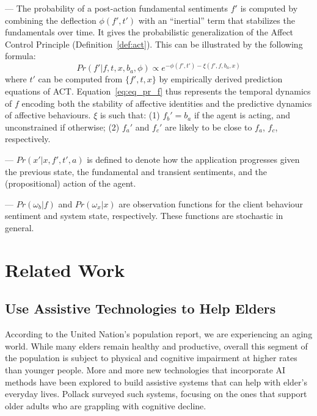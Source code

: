 --- The probability of a post-action fundamental sentiments $f'$ is computed by combining the deflection $\phi(f',t')$ with an ``inertial'' term that stabilizes the fundamentals over time. It gives the probabilistic generalization of the Affect Control Principle (Definition~\ref{def:act}). This can be illustrated by the following formula:
\begin{equation}\label{eq:eq_pr_f}
Pr(f'|f,t,x,b_{a},\phi) \propto e^{-\phi(f',t')-\xi(f',f,b_{a},x)} 
\end{equation}
where $t'$ can be computed from $\{f', t, x\}$ by empirically derived prediction equations of ACT. Equation~\ref{eq:eq_pr_f} thus represents the temporal dynamics of $f$ encoding both the stability of affective identities and the predictive dynamics of affective behaviours. $\xi$ is such that: (1) $f_{b}' = b_{a}$ if the agent is acting, and unconstrained if otherwise; (2) $f_{a}'$ and $f_{c}'$ are likely to be close to $f_{a}$, $f_{c}$, respectively.

--- $Pr(x'|x,f',t',a)$ is defined to denote how the application progresses given the previous state, the fundamental and transient sentiments, and the (propositional) action of the agent. 

--- $Pr(\omega_{b}|f)$ and $Pr(\omega_{x}|x)$ are observation functions for the client behaviour sentiment and system state, respectively. These functions are stochastic in general.

\section{Related Work}
\subsection{Use Assistive Technologies to Help Elders}

According to the United Nation's population report, we are experiencing an aging world. While many elders remain healthy and productive, overall this segment of the population is subject to physical and cognitive impairment at higher rates than younger people. More and more new technologies that incorporate AI methods have been explored to build assistive systems that can help with elder's everyday lives. Pollack \cite{pollack2005intelligent} surveyed such systems, focusing on the ones that support older adults who are grappling with cognitive decline.

